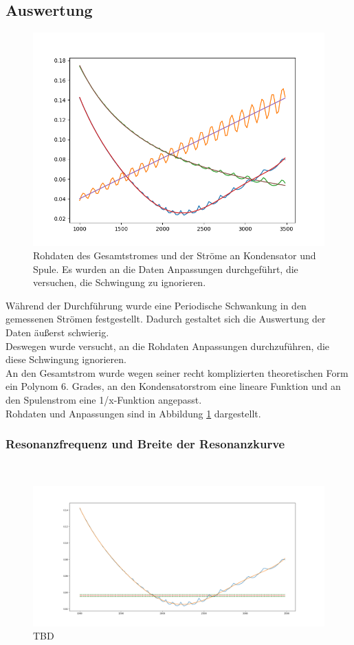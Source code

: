 \documentclass[12pt,a4paper]{article}
\begin{document}
\subsection{Auswertung}
\begin{figure}
\centering
\includegraphics[scale=1]{Bilder/Parallel_Rohdaten.png}
\caption{Rohdaten des Gesamtstromes und der Ströme an Kondensator und Spule. Es wurden an die Daten Anpassungen durchgeführt, die versuchen, die Schwingung zu ignorieren.}
\label{fig:parallel_Rohdaten}
\end{figure}

Während der Durchführung wurde eine Periodische Schwankung in den gemessenen Strömen festgestellt. Dadurch gestaltet sich die Auswertung der Daten äußerst schwierig.\\
Deswegen wurde versucht, an die Rohdaten Anpassungen durchzuführen, die diese Schwingung ignorieren.\\
An den Gesamtstrom wurde wegen seiner recht komplizierten theoretischen Form ein Polynom 6. Grades, an den Kondensatorstrom eine lineare Funktion und an den Spulenstrom eine 1/x-Funktion angepasst.\\
Rohdaten und Anpassungen sind in Abbildung \ref{fig:parallel_Rohdaten} dargestellt.


\subsubsection{Resonanzfrequenz und Breite der Resonanzkurve}\mbox{}\\
\begin{figure}
\centering
\includegraphics[scale=0.4]{Bilder/Parallel_Iges.png}
\caption{TBD}
\label{fig:parallel_Iges}
\end{figure}
\end{document}
